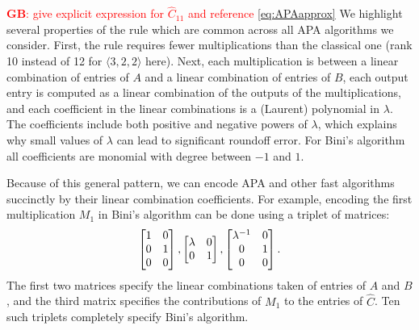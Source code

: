 \documentclass[conference]{IEEEtran}
\newcommand{\dims}[1]{\langle #1 \rangle}
\newcommand{\GB}[1]{\textcolor{red}{\textbf{GB}: #1}}
\begin{document}
\GB{give explicit expression for $\hat{C}_{11}$ and reference \cref{eq:APAapprox}}
We highlight several properties of the rule which are common across all APA algorithms we consider.
First, the rule requires fewer multiplications than the classical one (rank 10 instead of 12 for $\dims{3,2,2}$ here).
Next, each multiplication is between a linear combination of entries of $A$ and a linear combination of entries of $B$, each output entry is computed as a linear combination of the outputs of the multiplications, and each coefficient in the linear combinations is a (Laurent) polynomial in $\lambda$.
The coefficients include both positive and negative powers of $\lambda$, which explains why small values of $\lambda$ can lead to significant roundoff error.
For Bini's algorithm all coefficients are monomial with degree between $-1$ and $1$.

Because of this general pattern, we can encode APA and other fast algorithms succinctly by their linear combination coefficients.
For example, encoding the first multiplication $M_1$ in Bini's algorithm can be done using a triplet of matrices:
\begin{equation}
\label{eq:triplet}
\begin{bmatrix} 1 & 0 \\ 0 & 1 \\ 0 & 0 \end{bmatrix}, \hfill
\begin{bmatrix} \lambda & 0 \\ 0 & 1 \end{bmatrix}, \hfill
\begin{bmatrix} \lambda^{-1} & 0 \\ 0 & 1 \\ 0 & 0 \end{bmatrix}.
\end{equation}
The first two matrices specify the linear combinations taken of entries of $A$ and $B$, and the third matrix specifies the contributions of $M_1$ to the entries of $\hat C$.
Ten such triplets completely specify Bini's algorithm.
\end{document}
